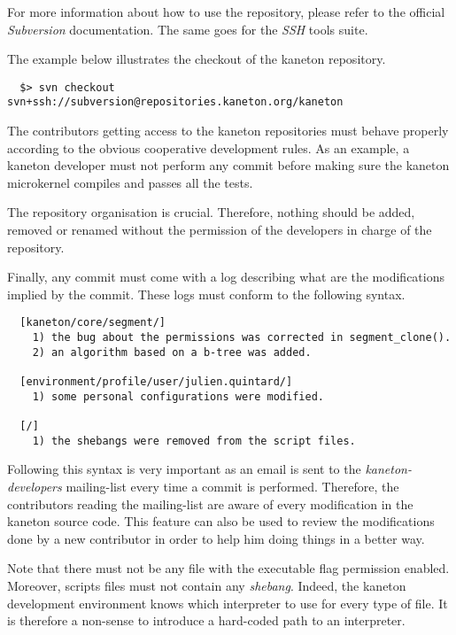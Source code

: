 For more information about how to use the repository, please refer to the
official \textit{Subversion} documentation. The same goes for the
\textit{SSH} tools suite.

The example below illustrates the checkout of the kaneton repository.

\begin{verbatim}
  $> svn checkout svn+ssh://subversion@repositories.kaneton.org/kaneton
\end{verbatim}

The contributors getting access to the kaneton repositories must behave
properly according to the obvious cooperative development rules. As an
example, a kaneton developer must not perform any commit before making sure
the kaneton microkernel compiles and passes all the tests.

The repository organisation is crucial. Therefore, nothing should be
added, removed or renamed without the permission of the developers in charge
of the repository.

Finally, any commit must come with a log describing what are the modifications
implied by the commit. These logs must conform to the following syntax.

\begin{verbatim}
  [kaneton/core/segment/]
    1) the bug about the permissions was corrected in segment_clone().
    2) an algorithm based on a b-tree was added.

  [environment/profile/user/julien.quintard/]
    1) some personal configurations were modified.

  [/]
    1) the shebangs were removed from the script files.
\end{verbatim}

Following this syntax is very important as an email is sent to the
\textit{kaneton-developers} mailing-list every time a commit is performed.
Therefore, the contributors reading the mailing-list are aware of every
modification in the kaneton source code. This feature can also be used
to review the modifications done by a new contributor in order to help
him doing things in a better way.

Note that there must not be any file with the executable flag permission
enabled. Moreover, scripts files must not contain any \textit{shebang}.
Indeed, the kaneton development environment knows which interpreter to
use for every type of file. It is therefore a non-sense to introduce a
hard-coded path to an interpreter.
